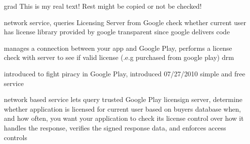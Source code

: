 grad%
This is my real text! Rest might be copied or not be checked!

%
network service, queries Licensing Server from Google
check whether current user has license
library provided by google
transparent since google delivers code

\cite{munteanLicense}
%

%
manages a connection between your app and Google Play, performs a license check with server to see if valid license (.e.g purchased from google play)
\gls{drm}
\cite{digipomLvl}
%

%
introduced to fight piracy in Google Play, introduced 07/27/2010
simple and free service
\cite{developersLicensingBlog}
%

%
network based service lets query trusted Google Play licensign server, determine whether application is licensed for current user based on buyers database
when, and how often, you want your application to check its license
control over how it handles the response, verifies the signed response data, and enforces access controls
\cite{developersLicensingOverview}
%
